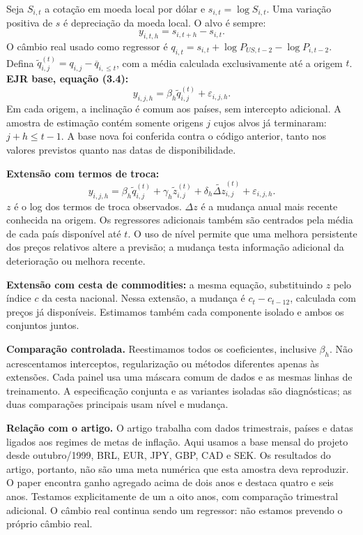 \documentclass[10pt,a4paper]{article}
\newcommand{\pagina}[1]{\clearpage{\Large\bfseries\color{navy} #1}\par\vspace{6pt}}
\begin{document}
\pagina{1. O que exatamente foi estimado}
Seja $S_{i,t}$ a cotação em moeda local por dólar e $s_{i,t}=\log S_{i,t}$. Uma variação positiva de $s$ é depreciação da moeda local. O alvo é sempre:
\[y_{i,t,h}=s_{i,t+h}-s_{i,t}.\]
O câmbio real usado como regressor é $q_{i,t}=s_{i,t}+\log P_{US,t-2}-\log P_{i,t-2}$. Defina $\widetilde q^{(t)}_{i,j}=q_{i,j}-\overline q_{i,\leq t}$, com a média calculada exclusivamente até a origem $t$.
\textbf{EJR base, equação (3.4):}
\[y_{i,j,h}=\beta_h\widetilde q^{(t)}_{i,j}+\varepsilon_{i,j,h}.\]
Em cada origem, a inclinação é comum aos países, sem intercepto adicional. A amostra de estimação contém somente origens $j$ cujos alvos já terminaram: $j+h\leq t-1$. A base nova foi conferida contra o código anterior, tanto nos valores previstos quanto nas datas de disponibilidade.

\textbf{Extensão com termos de troca:}
\[y_{i,j,h}=\beta_h\widetilde q^{(t)}_{i,j}+\gamma_h\widetilde z^{(t)}_{i,j}+\delta_h\widetilde{\Delta z}^{(t)}_{i,j}+\varepsilon_{i,j,h}.\]
$z$ é o log dos termos de troca observados. $\Delta z$ é a mudança anual mais recente conhecida na origem. Os regressores adicionais também são centrados pela média de cada país disponível até $t$. O uso de nível permite que uma melhora persistente dos preços relativos altere a previsão; a mudança testa informação adicional da deterioração ou melhora recente.

\textbf{Extensão com cesta de commodities:} a mesma equação, substituindo $z$ pelo índice $c$ da cesta nacional. Nessa extensão, a mudança é $c_t-c_{t-12}$, calculada com preços já disponíveis. Estimamos também cada componente isolado e ambos os conjuntos juntos.

\textbf{Comparação controlada.} Reestimamos todos os coeficientes, inclusive $\beta_h$. Não acrescentamos interceptos, regularização ou métodos diferentes apenas às extensões. Cada painel usa uma máscara comum de dados e as mesmas linhas de treinamento. A especificação conjunta e as variantes isoladas são diagnósticas; as duas comparações principais usam nível e mudança.

\textbf{Relação com o artigo.} O artigo trabalha com dados trimestrais, países e datas ligados aos regimes de metas de inflação. Aqui usamos a base mensal do projeto desde outubro/1999, BRL, EUR, JPY, GBP, CAD e SEK. Os resultados do artigo, portanto, não são uma meta numérica que esta amostra deva reproduzir. O paper encontra ganho agregado acima de dois anos e destaca quatro e seis anos. Testamos explicitamente de um a oito anos, com comparação trimestral adicional. O câmbio real continua sendo um regressor: não estamos prevendo o próprio câmbio real.
\end{document}
